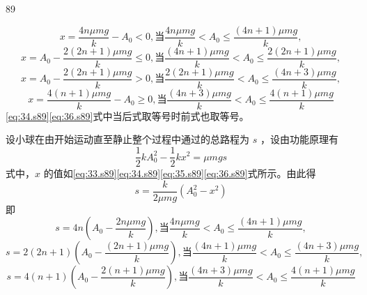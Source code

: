 \begin{solution}{89}
\begin{subsolution}
\begin{equation}
x = \frac {4 n \mu m g}{k} - A _ {0} <   0, \text {当} \frac {4 n \mu m g}{k} <   A _ {0} \leq \frac {(4 n + 1) \mu m g}{k},
\label{eq:33.s89}
\end{equation}
\begin{equation}
x = A _ {0} - \frac {2 (2 n + 1) \mu m g}{k} \leq 0, \text {当} \frac {(4 n + 1) \mu m g}{k} <   A _ {0} \leq \frac {2 (2 n + 1) \mu m g}{k},
\label{eq:34.s89}
\end{equation}
\begin{equation}
x = A _ {0} - \frac {2 (2 n + 1) \mu m g}{k} > 0, \text {当} \frac {2 (2 n + 1) \mu m g}{k} <   A _ {0} \leq \frac {(4 n + 3) \mu m g}{k},
\label{eq:35.s89}
\end{equation}
\begin{equation}
x = \frac {4 (n + 1) \mu m g}{k} - A _ {0} \geq 0, \text {当} \frac {(4 n + 3) \mu m g}{k} <   A _ {0} \leq \frac {4 (n + 1) \mu m g}{k}
\label{eq:36.s89}
\end{equation}
\eqref{eq:34.s89}\eqref{eq:36.s89}式中当后式取等号时前式也取等号。
\end{subsolution}
\begin{subsolution}
设小球在由开始运动直至静止整个过程中通过的总路程为 $s$ ，设由功能原理有
\begin{equation}
\frac {1}{2} k A _ {0} ^ {2} - \frac {1}{2} k x ^ {2} = \mu m g s
\label{eq:37.s89}
\end{equation}
式中，$x$ 的值如\eqref{eq:33.s89}\eqref{eq:34.s89}\eqref{eq:35.s89}\eqref{eq:36.s89}式所示。由此得
\begin{equation}
s = \frac {k}{2 \mu m g} (A _ {0} ^ {2} - x ^ {2})
\label{eq:38.s89}
\end{equation}
即
\begin{equation}
s = 4 n \left(A _ {0} - \frac {2 n \mu m g}{k}\right), \text {当} \frac {4 n \mu m g}{k} <   A _ {0} \leq \frac {(4 n + 1) \mu m g}{k},
\label{eq:39.s89}
\end{equation}
\begin{equation}
s = 2 (2 n + 1) \left(A _ {0} - \frac {(2 n + 1) \mu m g}{k}\right), \text {当} \frac {(4 n + 1) \mu m g}{k} <   A _ {0} \leq \frac {(4 n + 3) \mu m g}{k},
\label{eq:40.s89}
\end{equation}
\begin{equation}
s = 4 (n + 1) \left(A _ {0} - \frac {2 (n + 1) \mu m g}{k}\right), \text {当} \frac {(4 n + 3) \mu m g}{k} <   A _ {0} \leq \frac {4 (n + 1) \mu m g}{k}
\label{eq:41.s89}
\end{equation}
\end{subsolution}
\end{solution}